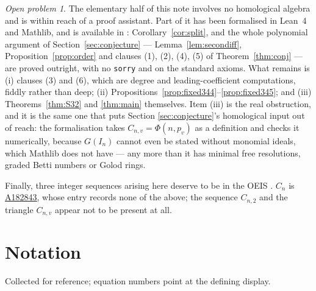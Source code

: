 \documentclass[a4paper,11pt,oneside,reqno]{amsart}
\theoremstyle{definition}
\theoremstyle{remark}
\newtheorem{openproblem}[definition]{Open problem}
\theoremstyle{plain}
\newcommand{\seqnum}[1]{\href{https://oeis.org/#1}{\underline{#1}}}
\begin{document}
\begin{openproblem}\label{op:lean}
  The elementary half of this note involves no homological algebra and is
  within reach of a proof assistant. Part of it has been formalised in Lean~4
  and Mathlib, and is available in \cite{gitrepo}: Corollary~\ref{cor:split},
  and the whole polynomial argument of Section~\ref{sec:conjecture} ---
  Lemma~\ref{lem:secondiff}, Proposition~\ref{prop:order} and clauses
  (1), (2), (4), (5) of Theorem~\ref{thm:conj} --- are proved outright, with no
  \texttt{sorry} and on the standard axioms. What remains is (i) clauses (3)
  and (6), which are degree and leading-coefficient computations, fiddly rather
  than deep; (ii) Propositions~\ref{prop:fixed344}--\ref{prop:fixed345}; and
  (iii) Theorems~\ref{thm:S32} and \ref{thm:main} themselves. Item (iii) is the
  real obstruction, and it is the same one that puts Section
  \ref{sec:conjecture}'s homological input out of reach: the formalisation
  takes \(C_{n,v} = \Phi(n,p_v)\) as a definition and checks it numerically,
  because \(G(I_n)\) cannot even be stated without monomial ideals, which
  Mathlib does not have --- any more than it has minimal free resolutions,
  graded Betti numbers or Golod rings.
\end{openproblem}

Finally, three integer sequences arising here deserve to be in the OEIS \cite{OEIS}.
\(C_n\) is \seqnum{A182843}, whose entry records none of the above; the
sequence \(C_{n,2}\) and the triangle \(C_{n,v}\) appear not to be present at
all.

\section*{Notation}

Collected for reference; equation numbers point at the defining display.
\end{document}
